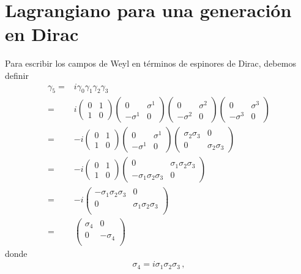 \section{Lagrangiano para una generación en Dirac}

Para escribir los campos de Weyl en términos de espinores de Dirac, debemos definir
\begin{align}
  \gamma_5=&i\gamma_0\gamma_1\gamma_2\gamma_3 \nonumber\\
=&i
\begin{pmatrix}
0 & 1\\
1 & 0  
\end{pmatrix}
\begin{pmatrix}
0 & \sigma^1\\
-\sigma^1 & 0  
\end{pmatrix}
\begin{pmatrix}
0 & \sigma^2\\
-\sigma^2 & 0  
\end{pmatrix}
\begin{pmatrix}
0 & \sigma^3\\
-\sigma^3 & 0  
\end{pmatrix}\nonumber\\
=&-i\begin{pmatrix}
0 & 1\\
1 & 0  
\end{pmatrix}
\begin{pmatrix}
0 & \sigma^1\\
-\sigma^1 & 0  
\end{pmatrix}
\begin{pmatrix}
\sigma_2\sigma_3 & 0\\
0 & \sigma_2\sigma_3
\end{pmatrix}\nonumber\\
=&-i\begin{pmatrix}
0 & 1\\
1 & 0  
\end{pmatrix}
\begin{pmatrix}
0 & \sigma_1\sigma_2\sigma_3 \\
-\sigma_1\sigma_2\sigma_3 & 0
\end{pmatrix}\nonumber\\
=&-i\begin{pmatrix}
-\sigma_1\sigma_2\sigma_3 & 0 \\
0 &\sigma_1\sigma_2\sigma_3\\
\end{pmatrix}\nonumber\\
=&\begin{pmatrix}
\sigma_4 & 0 \\
0 &-\sigma_4\\
\end{pmatrix}
\end{align}
donde
\begin{align}
  \sigma_4=i\sigma_1\sigma_2\sigma_3\,,
\end{align}

